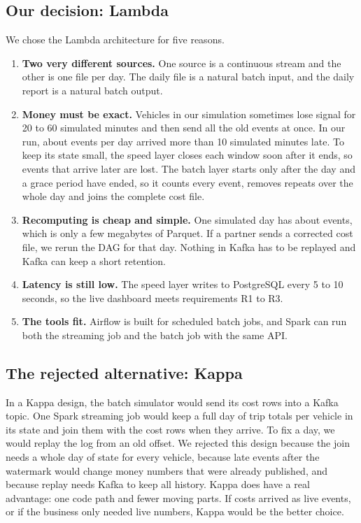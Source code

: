 \subsection{Our decision: Lambda}
We chose the Lambda architecture for five reasons.
\begin{enumerate}
\item \textbf{Two very different sources.} One source is a continuous stream and the other is one file
per day. The daily file is a natural batch input, and the daily report is a natural batch output.
\item \textbf{Money must be exact.} Vehicles in our simulation sometimes lose signal for 20 to 60 simulated
minutes and then send all the old events at once. In our run, about \LateEventsPerDay{} events per day
arrived more than 10 simulated minutes late. To keep its state small, the speed layer closes each window
soon after it ends, so events that arrive later are lost. The batch layer starts only after the day and a
grace period have ended, so it counts every event, removes repeats over the whole day and joins the complete
cost file.
\item \textbf{Recomputing is cheap and simple.} One simulated day has about \EventsPerDay{} events, which is
only a few megabytes of Parquet. If a partner sends a corrected cost file, we rerun the DAG for that day.
Nothing in Kafka has to be replayed and Kafka can keep a short retention.
\item \textbf{Latency is still low.} The speed layer writes to PostgreSQL every 5 to 10 seconds, so the
live dashboard meets requirements R1 to R3.
\item \textbf{The tools fit.} Airflow is built for scheduled batch jobs, and Spark can run both the
streaming job and the batch job with the same API.
\end{enumerate}

\subsection{The rejected alternative: Kappa}
In a Kappa design, the batch simulator would send its cost rows into a Kafka topic. One Spark streaming job
would keep a full day of trip totals per vehicle in its state and join them with the cost rows when they
arrive. To fix a day, we would replay the log from an old offset. We rejected this design because the join
needs a whole day of state for every vehicle, because late events after the watermark would change money
numbers that were already published, and because replay needs Kafka to keep all history. Kappa does have a
real advantage: one code path and fewer moving parts. If costs arrived as live events, or if the business
only needed live numbers, Kappa would be the better choice.

